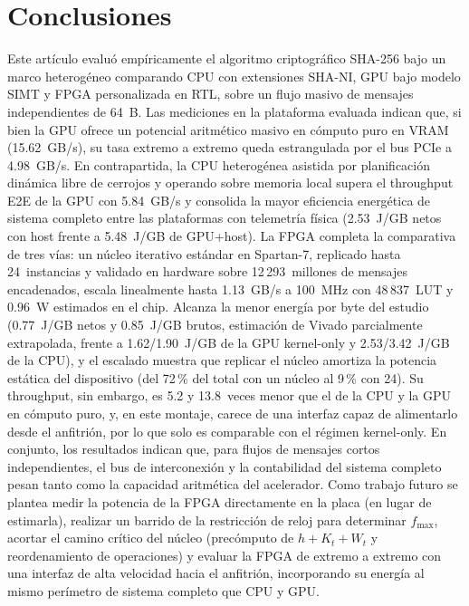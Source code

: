 \documentclass[conference]{IEEEtran}
\begin{document}


\section{Conclusiones}
Este artículo evaluó empíricamente el algoritmo criptográfico SHA-256 bajo un marco heterogéneo comparando CPU con extensiones SHA-NI, GPU bajo modelo SIMT y FPGA personalizada en RTL, sobre un flujo masivo de mensajes independientes de 64~B. Las mediciones en la plataforma evaluada indican que, si bien la GPU ofrece un potencial aritmético masivo en cómputo puro en VRAM (15.62~GB/s), su tasa extremo a extremo queda estrangulada por el bus PCIe a 4.98~GB/s. En contrapartida, la CPU heterogénea asistida por planificación dinámica libre de cerrojos y operando sobre memoria local supera el throughput E2E de la GPU con 5.84~GB/s y consolida la mayor eficiencia energética de sistema completo entre las plataformas con telemetría física (2.53~J/GB netos con host frente a 5.48~J/GB de GPU+host). La FPGA completa la comparativa de tres vías: un núcleo iterativo estándar en Spartan-7, replicado hasta 24~instancias y validado en hardware sobre 12\,293~millones de mensajes encadenados, escala linealmente hasta 1.13~GB/s a 100~MHz con 48\,837~LUT y 0.96~W estimados en el chip. Alcanza la menor energía por byte del estudio (0.77~J/GB netos y 0.85~J/GB brutos, estimación de Vivado parcialmente extrapolada, frente a 1.62/1.90~J/GB de la GPU kernel-only y 2.53/3.42~J/GB de la CPU), y el escalado muestra que replicar el núcleo amortiza la potencia estática del dispositivo (del 72\,\% del total con un núcleo al 9\,\% con 24). Su throughput, sin embargo, es 5.2 y 13.8~veces menor que el de la CPU y la GPU en cómputo puro, y, en este montaje, carece de una interfaz capaz de alimentarlo desde el anfitrión, por lo que solo es comparable con el régimen kernel-only. En conjunto, los resultados indican que, para flujos de mensajes cortos independientes, el bus de interconexión y la contabilidad del sistema completo pesan tanto como la capacidad aritmética del acelerador. Como trabajo futuro se plantea medir la potencia de la FPGA directamente en la placa (en lugar de estimarla), realizar un barrido de la restricción de reloj para determinar $f_{\max}$, acortar el camino crítico del núcleo (precómputo de $h + K_t + W_t$ y reordenamiento de operaciones) y evaluar la FPGA de extremo a extremo con una interfaz de alta velocidad hacia el anfitrión, incorporando su energía al mismo perímetro de sistema completo que CPU y GPU.




\vspace{12pt}
\end{document}
